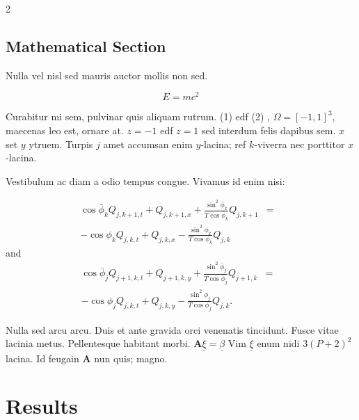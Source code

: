 \documentclass[a0,portrait]{a0poster}
\begin{document}
\begin{multicols}{2}

\subsection*{Mathematical Section}

Nulla vel nisl sed mauris auctor mollis non sed. 

\begin{equation}
E = mc^{2}
\label{eqn:Einstein}
\end{equation}

Curabitur mi sem, pulvinar quis aliquam rutrum. (1) edf (2)
, $\Omega=[-1,1]^3$, maecenas leo est, ornare at. $z=-1$ edf $z=1$ sed interdum felis dapibus sem. $x$ set $y$ ytruem. 
Turpis $j$ amet accumsan enim $y$-lacina; 
ref $k$-viverra nec porttitor $x$-lacina. 

Vestibulum ac diam a odio tempus congue. Vivamus id enim nisi:

\begin{eqnarray}
\cos\bar{\phi}_k Q_{j,k+1,t} + Q_{j,k+1,x}+\frac{\sin^2\bar{\phi}_k}{T\cos\bar{\phi}_k} Q_{j,k+1} &=&\nonumber\\ 
-\cos\phi_k Q_{j,k,t} + Q_{j,k,x}-\frac{\sin^2\phi_k}{T\cos\phi_k} Q_{j,k}\label{edgek}
\end{eqnarray}
and
\begin{eqnarray}
\cos\bar{\phi}_j Q_{j+1,k,t} + Q_{j+1,k,y}+\frac{\sin^2\bar{\phi}_j}{T\cos\bar{\phi}_j} Q_{j+1,k}&=&\nonumber \\
-\cos\phi_j Q_{j,k,t} + Q_{j,k,y}-\frac{\sin^2\phi_j}{T\cos\phi_j} Q_{j,k}.\label{edgej}
\end{eqnarray} 

Nulla sed arcu arcu. Duis et ante gravida orci venenatis tincidunt. Fusce vitae lacinia metus. Pellentesque habitant morbi. $\mathbf{A}\underline{\xi}=\underline{\beta}$ Vim $\underline{\xi}$ enum nidi $3(P+2)^{2}$ lacina. Id feugain $\mathbf{A}$ nun quis; magno.


\section*{Results}


\end{multicols}
\end{document}
